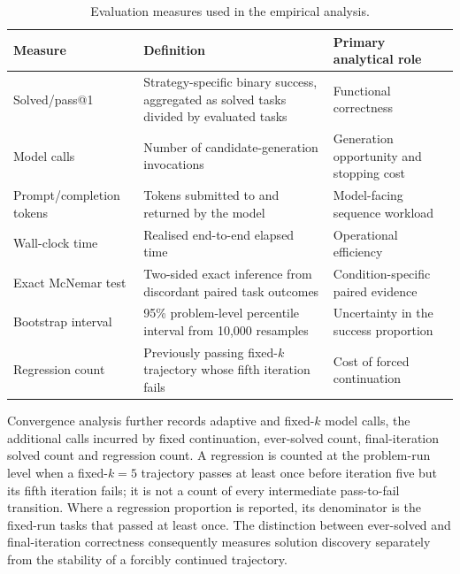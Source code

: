 \begin{table}[htbp]
    \centering
    \caption{Evaluation measures used in the empirical analysis.}
    \label{tab:evaluation-metrics}
    \footnotesize
    \renewcommand{\arraystretch}{1.12}
    \setlength{\tabcolsep}{3pt}
    \begin{tabular}{p{} p{} p{}}
        \hline
        \raggedright Measure & \raggedright Definition & \raggedright Primary analytical role \tabularnewline
        \hline
        \raggedright Solved/pass@1 & \raggedright Strategy-specific binary success, aggregated as solved tasks divided by evaluated tasks & \raggedright Functional correctness \tabularnewline
        \raggedright Model calls & \raggedright Number of candidate-generation invocations & \raggedright Generation opportunity and stopping cost \tabularnewline
        \raggedright Prompt/completion tokens & \raggedright Tokens submitted to and returned by the model & \raggedright Model-facing sequence workload \tabularnewline
        \raggedright Wall-clock time & \raggedright Realised end-to-end elapsed time & \raggedright Operational efficiency \tabularnewline
        \raggedright Exact McNemar test & \raggedright Two-sided exact inference from discordant paired task outcomes & \raggedright Condition-specific paired evidence \tabularnewline
        \raggedright Bootstrap interval & \raggedright 95\% problem-level percentile interval from 10,000 resamples & \raggedright Uncertainty in the success proportion \tabularnewline[4pt]
        \raggedright Regression count & \raggedright Previously passing fixed-$k$ trajectory whose fifth iteration fails & \raggedright Cost of forced continuation \tabularnewline
        \hline
    \end{tabular}
\end{table}

Convergence analysis further records adaptive and fixed-$k$ model calls, the additional calls incurred by fixed continuation, ever-solved count, final-iteration solved count and regression count. A regression is counted at the problem-run level when a fixed-$k=5$ trajectory passes at least once before iteration five but its fifth iteration fails; it is not a count of every intermediate pass-to-fail transition. Where a regression proportion is reported, its denominator is the fixed-run tasks that passed at least once. The distinction between ever-solved and final-iteration correctness consequently measures solution discovery separately from the stability of a forcibly continued trajectory.

